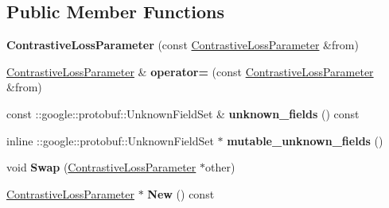 \subsection*{Public Member Functions}
\begin{DoxyCompactItemize}
\item 
\mbox{\label{classcaffe_1_1_contrastive_loss_parameter_a17e143377bae21e208c541ea20637922}} 
{\bfseries Contrastive\+Loss\+Parameter} (const \mbox{\hyperlink{classcaffe_1_1_contrastive_loss_parameter}{Contrastive\+Loss\+Parameter}} \&from)
\item 
\mbox{\label{classcaffe_1_1_contrastive_loss_parameter_ac6c4e1f1780d2320ab143d1162acf8e6}} 
\mbox{\hyperlink{classcaffe_1_1_contrastive_loss_parameter}{Contrastive\+Loss\+Parameter}} \& {\bfseries operator=} (const \mbox{\hyperlink{classcaffe_1_1_contrastive_loss_parameter}{Contrastive\+Loss\+Parameter}} \&from)
\item 
\mbox{\label{classcaffe_1_1_contrastive_loss_parameter_a1c7b14c3983968d51b185c4eebff916e}} 
const \+::google\+::protobuf\+::\+Unknown\+Field\+Set \& {\bfseries unknown\+\_\+fields} () const
\item 
\mbox{\label{classcaffe_1_1_contrastive_loss_parameter_ae06b0de96f41d99b762a109c223cd89e}} 
inline \+::google\+::protobuf\+::\+Unknown\+Field\+Set $\ast$ {\bfseries mutable\+\_\+unknown\+\_\+fields} ()
\item 
\mbox{\label{classcaffe_1_1_contrastive_loss_parameter_ad3f53f5bf22eb0f79f9b3fb5afebdbaa}} 
void {\bfseries Swap} (\mbox{\hyperlink{classcaffe_1_1_contrastive_loss_parameter}{Contrastive\+Loss\+Parameter}} $\ast$other)
\item 
\mbox{\label{classcaffe_1_1_contrastive_loss_parameter_a502163f2b86956d3dfbb9ca86642e06c}} 
\mbox{\hyperlink{classcaffe_1_1_contrastive_loss_parameter}{Contrastive\+Loss\+Parameter}} $\ast$ {\bfseries New} () const
\item 
\mbox{\label{classcaffe_1_1_contrastive_loss_parameter_a5cef8792e37a6a04230b040d0cba8397}} 

\end{DoxyCompactItemize}
